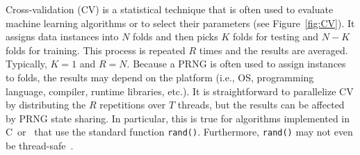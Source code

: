 \smallskip
Cross-validation (CV) is a statistical technique 
that is often used to evaluate machine learning algorithms or to select their
parameters (see Figure~\ref{fig:CV}). It assigns data instances into $N$ folds and then picks $K$ folds
for testing and $N - K$ folds for training. This process is repeated $R$ times and the
results are averaged. Typically, $K=1$ and $R=N$.
Because a PRNG is often used to assign instances to folds, the results may
depend on the platform (i.e., OS, programming language, compiler,
runtime libraries, etc.).
It is straightforward to parallelize CV by distributing the $R$ repetitions over
$T$ threads, but the results can be affected by PRNG state sharing. In
particular, this is true for algorithms implemented in C~or~\CC{} that use the
standard function \verb|rand()|. Furthermore, \verb|rand()| may not even be
thread-safe~.


